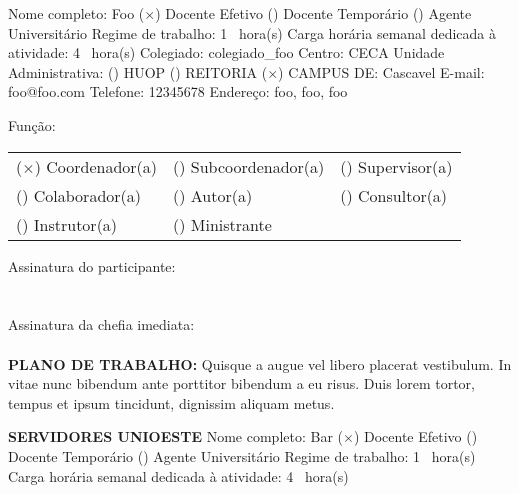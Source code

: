 \documentclass[12pt,a4paper,oneside]{article}%
\begin{document}
\begin{enumerate}
\begin{mdframed}[innertopmargin=5pt, innerleftmargin=3pt, innerrightmargin=3pt]
Nome completo: %
Foo%
\newline%
 ($\times$) Docente Efetivo %
 () Docente Temporário %
 () Agente Universitário %
\newline%
Regime de trabalho: %
1%
\ hora(s) \hfill%
Carga horária semanal dedicada à atividade: %
4%
\ hora(s) \hfill%
\newline%
Colegiado: %
colegiado\_foo%
\hfill%
Centro: %
CECA%
\newline%
Unidade Administrativa: %
() HUOP %
() REITORIA %
($\times$) CAMPUS DE: %
Cascavel%
\newline%
E-mail: %
foo@foo.com%
\newline%
Telefone: %
12345678%
\newline%
Endereço: %
foo, foo, foo%
\newline%
\begin{mdframed}[innertopmargin=5pt, innerleftmargin=3pt, innerrightmargin=3pt]%
Função: %
\newline%
\begin{tabularx}{\linewidth}{XXX}%
($\times$) Coordenador(a)&() Subcoordenador(a)&() Supervisor(a)\\%
() Colaborador(a)&() Autor(a)&() Consultor(a)\\%
() Instrutor(a)&() Ministrante&\\%
\end{tabularx}%
\end{mdframed}%
\bigskip%
\bigskip%
Assinatura do participante: \hrulefill \\ \\ \\%
Assinatura da chefia imediata: \hrulefill \\ \\%
\textbf{PLANO DE TRABALHO: }%
Quisque a augue vel libero placerat vestibulum. In vitae nunc bibendum ante porttitor bibendum a eu risus. Duis lorem tortor, tempus et ipsum tincidunt, dignissim aliquam metus.%
\end{mdframed}%
\begin{mdframed}[innertopmargin=5pt, innerleftmargin=3pt, innerrightmargin=3pt]%
\textbf{SERVIDORES UNIOESTE }%
\newline%
Nome completo: %
Bar%
\newline%
 ($\times$) Docente Efetivo %
 () Docente Temporário %
 () Agente Universitário %
\newline%
Regime de trabalho: %
1%
\ hora(s) \hfill%
Carga horária semanal dedicada à atividade: %
4%
\ hora(s) \hfill%
\newline%

\end{mdframed}
\end{enumerate}
\end{document}
